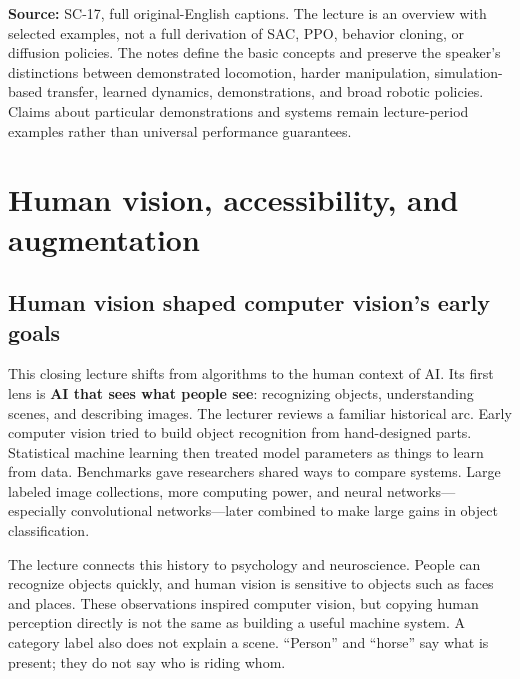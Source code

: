 \textbf{Source:} SC-17, full original-English captions. The lecture is an overview with selected examples, not a full derivation of SAC, PPO, behavior cloning, or diffusion policies. The notes define the basic concepts and preserve the speaker's distinctions between demonstrated locomotion, harder manipulation, simulation-based transfer, learned dynamics, demonstrations, and broad robotic policies. Claims about particular demonstrations and systems remain lecture-period examples rather than universal performance guarantees.

\section{Human vision, accessibility, and augmentation}\label{04-visual-computing-ii-ch034-human-vision-accessibility-and-augmentation}

\hypertarget{04-visual-computing-ii-ch034-human-vision-accessibility-and-augmentation}{}

\subsection{Human vision shaped computer vision's early goals}\label{04-visual-computing-ii-ch034-human-vision-shaped-computer-visions-early-goals}

\hypertarget{04-visual-computing-ii-ch034-human-vision-shaped-computer-visions-early-goals}{}

This closing lecture shifts from algorithms to the human context of AI. Its first lens is \textbf{AI that sees what people see}: recognizing objects, understanding scenes, and describing images. The lecturer reviews a familiar historical arc. Early computer vision tried to build object recognition from hand-designed parts. Statistical machine learning then treated model parameters as things to learn from data. Benchmarks gave researchers shared ways to compare systems. Large labeled image collections, more computing power, and neural networks---especially convolutional networks---later combined to make large gains in object classification.

The lecture connects this history to psychology and neuroscience. People can recognize objects quickly, and human vision is sensitive to objects such as faces and places. These observations inspired computer vision, but copying human perception directly is not the same as building a useful machine system. A category label also does not explain a scene. ``Person'' and ``horse'' say what is present; they do not say who is riding whom.

